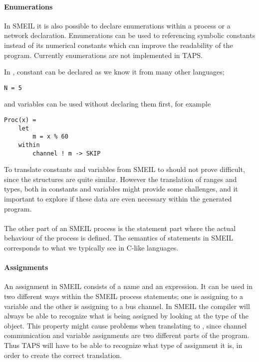 \paragraph{Enumerations}
In SMEIL it is also possible to declare enumerations within a process or a network declaration. Emumerations can be used to referencing symbolic constants instead of its numerical constants which can improve the readability of the program.
Currently enumerations are not implemented in TAPS.



In \cspm, constant can be declared as we know it from many other languages;
\begin{verbatim}
N = 5
\end{verbatim}
and variables can be used without declaring them first, for example
\begin{verbatim}
Proc(x) =
    let
        m = x % 60
    within
        channel ! m -> SKIP
\end{verbatim}

To translate constants and variables from SMEIL to \cspm should not prove difficult, since the structures are quite similar. However the translation of ranges and types, both in constants and variables might provide some challenges, and it important to explore if these data are even necessary within the generated \cspm program.
\\\\

The other part of an SMEIL process is the statement part where the actual behaviour of the process is defined. The semantics of statements in SMEIL corresponds to what we typically see in C-like languages.

\paragraph{Assignments}
An assignment in SMEIL consists of a name and an expression. It can be used in two different ways within the SMEIL process statements; one is assigning to a variable and the other is assigning to a bus channel. In SMEIL the compiler will always be able to recognize what is being assigned by looking at the type of the object.
This property might cause problems when translating to \cspm, since channel communication and variable assignments are two different parts of the \cspm program. Thus TAPS will have to be able to recognize what type of assignment it is, in order to create the correct translation.
